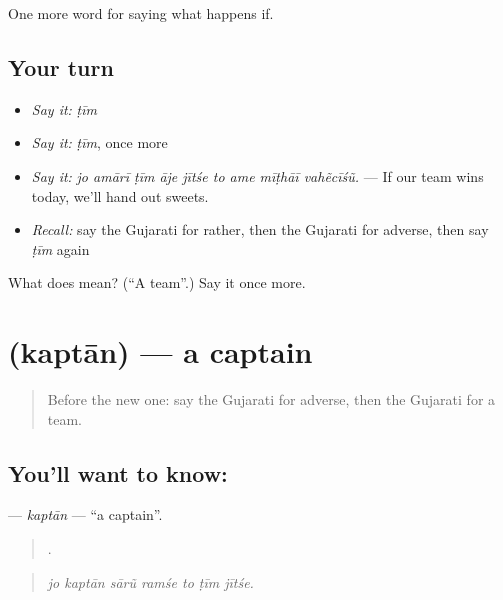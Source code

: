 \begin{grammarlens}[title={What you've built}]
One more word for saying what happens if.
\end{grammarlens}

\subsection*{Your turn}
\begin{itemize}
\raggedright
  \item \emph{Say it:} \emph{ṭīm}
  \item \emph{Say it:} \emph{ṭīm}, once more
  \item \emph{Say it:} \emph{jo amārī ṭīm āje jītśe to ame mīṭhāī vahẽcīśũ.} — If our team wins today, we'll hand out sweets.
  \item \emph{Recall:} say the Gujarati for rather, then the Gujarati for adverse, then say \emph{ṭīm} again
\end{itemize}

\begin{tcolorbox}[breakable,colback=teal!4,colframe=teal!35!black,title={Before you move on}]
What does  mean? (\textquotedblleft{}A team\textquotedblright{}.) Say it once more.
\end{tcolorbox}
\section[\texorpdfstring{\gu{કપ્તાન} (kaptān)}{કપ્તાન (kaptān)}]{ (kaptān) — a captain}

\label{lesson:GU-C548-kaptan}



\begin{quote}
Before the new one: say the Gujarati for adverse, then the Gujarati for a team.
\end{quote}

\subsection*{You'll want to know: }
\textbf{} — \emph{kaptān} — \textquotedblleft{}a captain\textquotedblright{}.

\begin{quote}
      .
\end{quote}

\begin{quote}
\emph{jo kaptān sārũ ramśe to ṭīm jītśe.}
\end{quote}

